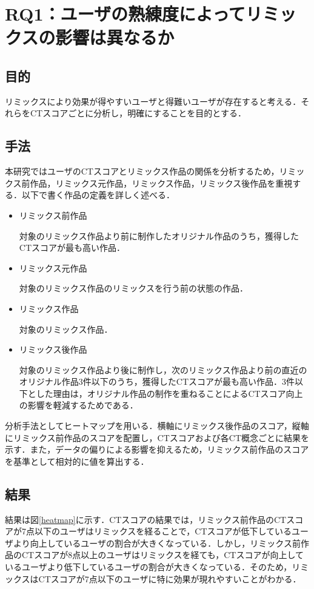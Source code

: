 \documentclass[submit,techrep,noauthor]{ipsj}
\begin{document}
\section{RQ1：ユーザの熟練度によってリミックスの影響は異なるか}
\subsection{目的}
リミックスにより効果が得やすいユーザと得難いユーザが存在すると考える．それらをCTスコアごとに分析し，明確にすることを目的とする．

\subsection{手法}
本研究ではユーザのCTスコアとリミックス作品の関係を分析するため，リミックス前作品，リミックス元作品，リミックス作品，リミックス後作品を重視する．以下で書く作品の定義を詳しく述べる．

\begin{itemize}
    \item リミックス前作品
    
    対象のリミックス作品より前に制作したオリジナル作品のうち，獲得したCTスコアが最も高い作品．
    
    \item リミックス元作品

    対象のリミックス作品のリミックスを行う前の状態の作品．
    
    \item リミックス作品

    対象のリミックス作品．
    
    \item リミックス後作品

    対象のリミックス作品より後に制作し，次のリミックス作品より前の直近のオリジナル作品3件以下のうち，獲得したCTスコアが最も高い作品．3件以下とした理由は，オリジナル作品の制作を重ねることによるCTスコア向上の影響を軽減するためである．
    
\end{itemize}

分析手法としてヒートマップを用いる．横軸にリミックス後作品のスコア，縦軸にリミックス前作品のスコアを配置し，CTスコアおよび各CT概念ごとに結果を示す．また，データの偏りによる影響を抑えるため，リミックス前作品のスコアを基準として相対的に値を算出する．

\subsection{結果}
結果は図\ref{heatmap}に示す．CTスコアの結果では，リミックス前作品のCTスコアが7点以下のユーザはリミックスを経ることで，CTスコアが低下しているユーザより向上しているユーザの割合が大きくなっている．しかし，リミックス前作品のCTスコアが8点以上のユーザはリミックスを経ても，CTスコアが向上しているユーザより低下しているユーザの割合が大きくなっている．そのため，リミックスはCTスコアが7点以下のユーザに特に効果が現れやすいことがわかる．
\end{document}
